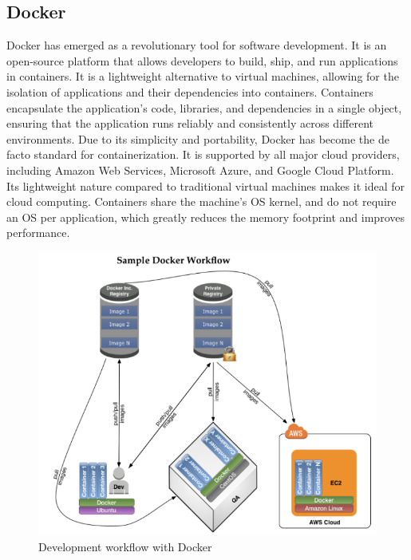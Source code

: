 \subsection{Docker}

Docker has emerged as a revolutionary tool for software development. It is an open-source platform that allows developers to build, ship, and run applications in containers. It is a lightweight alternative to virtual machines, allowing for the isolation of applications and their dependencies into containers. Containers encapsulate the application's code, libraries, and dependencies in a single object, ensuring that the application runs reliably and consistently across different environments.
Due to its simplicity and portability, Docker has become the de facto standard for containerization. It is supported by all major cloud providers, including Amazon Web Services, Microsoft Azure, and Google Cloud Platform. Its lightweight nature compared to traditional virtual machines makes it ideal for cloud computing. Containers share the machine's OS kernel, and do not require an OS per application, which greatly reduces the memory footprint and improves performance. \cite{merkel2014docker}

\begin{figure}[ht]
    \centering
    \includegraphics[width=0.8\linewidth]{images/docker.png}
    \caption{Development workflow with Docker}
    \label{fig:docker}
\end{figure}

